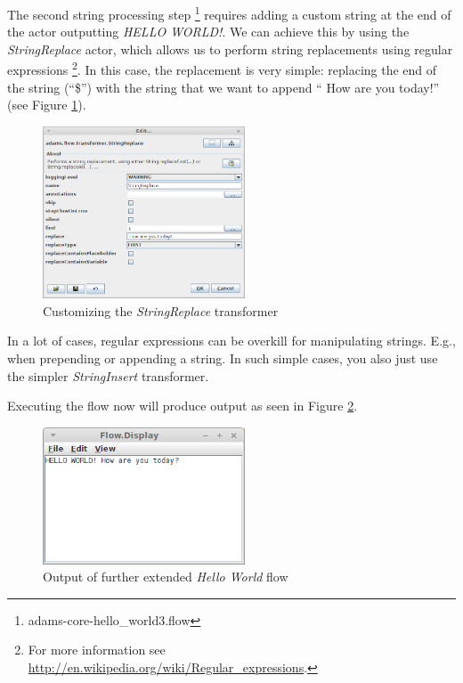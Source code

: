 The second string processing step \footnote{adams-core-hello\_world3.flow}
requires adding a custom string at the end of the actor outputting \textit{HELLO
WORLD!}. We can achieve this by using the \textit{StringReplace} actor, which allows us to perform string replacements
using regular expressions \footnote{For more information see
\url{http://en.wikipedia.org/wiki/Regular_expressions}{}.}. In this case, the
replacement is very simple: replacing the end of the string (``\$'') with the
string that we want to append `` How are you today!'' (see Figure
\ref{floweditor-helloworld-processdata6}).

\begin{figure}[htb]
  \centering
  \includegraphics[width=6.0cm]{images/floweditor-helloworld-processdata6.png}
  \caption{Customizing the \textit{StringReplace} transformer}
  \label{floweditor-helloworld-processdata6}
\end{figure}

In a lot of cases, regular expressions can be overkill for manipulating strings.
E.g., when prepending or appending a string. In such simple cases, you also
just use the simpler \textit{StringInsert} transformer.

Executing the flow now will produce output as seen in Figure
\ref{floweditor-helloworld-processdata7}.

\begin{figure}[htb]
  \centering
  \includegraphics[width=6.0cm]{images/floweditor-helloworld-processdata7.png}
  \caption{Output of further extended \textit{Hello World} flow}
  \label{floweditor-helloworld-processdata7}
\end{figure}

